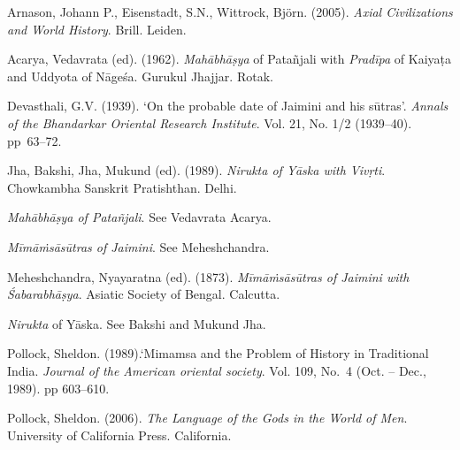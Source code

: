 \begin{thebibliography}{99}
 Arnason, Johann P., Eisenstadt, S.N., Wittrock, Björn. (2005). \textit{Axial Civilizations and World History}. Brill. Leiden.

  Acarya, Vedavrata (ed). (1962). \textit{Mahābhāṣya} of Patañjali with \textit{Pradīpa} of Kaiyaṭa and Uddyota of Nāgeśa. Gurukul Jhajjar. Rotak.

  Devasthali, G.V. (1939). ‘On the probable date of Jaimini and his sūtras’. \textit{Annals of the Bhandarkar Oriental Research Institute}. Vol. 21, No. 1/2 (1939--40). pp~63--72.

  Jha, Bakshi, Jha, Mukund (ed). (1989). \textit{Nirukta of Yāska with Vivṛti}. Chowkambha Sanskrit Pratishthan. Delhi.

  \textit{Mahābhāṣya of Patañjali}. See Vedavrata Acarya.

  \textit{Mīmāṁsāsūtras of Jaimini}. See Meheshchandra.

  Meheshchandra, Nyayaratna (ed). (1873). \textit{Mīmāṁsāsūtras of Jaimini with Śabarabhāṣya}. Asiatic Society of Bengal. Calcutta.

  \textit{Nirukta} of Yāska. See Bakshi and Mukund Jha.

  Pollock, Sheldon. (1989).‘Mimamsa and the Problem of History in Traditional India. \textit{Journal of the American oriental society}. Vol. 109, No.~4 (Oct. -- Dec., 1989). pp 603--610.

  Pollock, Sheldon. (2006). \textit{The Language of the Gods in the World of Men}. University of California Press. California.

 \end{thebibliography}

